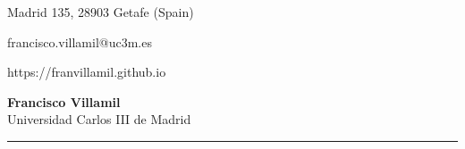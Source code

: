 \documentclass[a4paper, 12pt]{article}
\begin{document}
\begin{flushright}
  \item {Madrid 135, 28903 Getafe (Spain)}
  \item { francisco.villamil@uc3m.es }
  \item { https://franvillamil.github.io }
\end{flushright}\vspace{-65pt}

\begin{flushleft}  %
  {\bfseries\Large Francisco Villamil}\\\vspace{8pt}
  Universidad Carlos III de Madrid\\\vspace{10pt}
  \noindent\rule{\textwidth}{0.4pt}
\end{flushleft}

\end{document}
